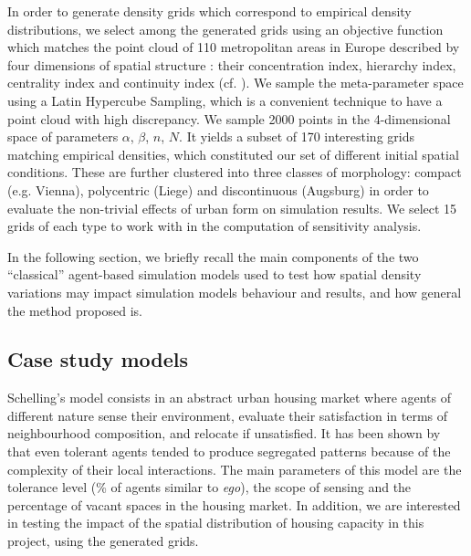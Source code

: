 \documentclass[Royal,sageh,times]{sagej}
\begin{document}

In order to generate density grids which correspond to empirical density distributions, we select among the generated grids using an objective function which matches the point cloud of 110 metropolitan areas in Europe described by four dimensions of spatial structure : their concentration index, hierarchy index, centrality index and continuity index (cf. \cite{LeNechet2015}). We sample the meta-parameter space using a Latin Hypercube Sampling, which is a convenient technique to have a point cloud with high discrepancy. We sample 2000 points in the 4-dimensional space of parameters {$\alpha$, $\beta$, $n$, $N$}. It yields a subset of 170 interesting grids matching empirical densities, which constituted our set of different initial spatial conditions. These are further clustered into three classes of morphology: compact (e.g. Vienna), polycentric (Liege) and discontinuous (Augsburg) in order to evaluate the non-trivial effects of urban form on simulation results. We select 15 grids of each type to work with in the computation of sensitivity analysis.  





In the following section, we briefly recall the main components of the two ``classical'' agent-based simulation models used to test how spatial density variations may impact simulation models behaviour and results, and how general the method proposed is.

\subsection{Case study models}


Schelling's model consists in an abstract urban housing market where agents of different nature sense their environment, evaluate their satisfaction in terms of neighbourhood composition, and relocate if unsatisfied. It has been shown by \cite{Schelling1969} that even tolerant agents tended to produce segregated patterns because of the complexity of their local interactions. The main parameters of this model are the tolerance level (\% of agents similar to {\it ego}), the scope of sensing and the percentage of vacant spaces in the housing market. In addition, we are interested in testing the impact of the spatial distribution of housing capacity in this project, using the generated grids. \\
\end{document}

